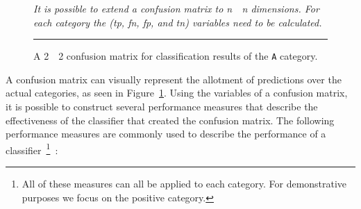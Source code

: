 \begin{figure}[!tb]
  \centering
  \caption{A 2~\times~2 confusion matrix for classification results of the \texttt{A} category.}
  \vspace{1mm}
  \footnotesize{\emph{It is possible to extend a confusion matrix to n~\times~n dimensions. For each category the (\gls{tp}, \gls{fn}, \gls{fp}, and \gls{tn}) variables need to be calculated.}}
  \vspace{2mm}
  \hrule
  \label{fig:example_confusion_matrix}
\end{figure}

A confusion matrix can visually represent the allotment of predictions over the actual categories, as seen in Figure~\ref{fig:example_confusion_matrix}. Using the variables of a confusion matrix, it is possible to construct several performance measures that describe the effectiveness of the classifier that created the confusion matrix. The following performance measures are commonly used to describe the performance of a classifier~\footnote{All of these measures can all be applied to each category. For demonstrative purposes we focus on the positive category.}~\cite{SJS06}:


